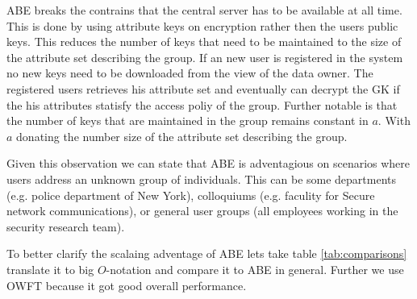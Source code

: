 ABE breaks the contrains that the central server has to be available at all time. This is done by using attribute keys on encryption rather then the users public keys. This reduces the number of keys that need to be maintained to the size of the attribute set describing the group. If an new user is registered in the system no new keys need to be downloaded from the view of the data owner. The registered users retrieves his attribute set and eventually can decrypt the GK if the his attributes statisfy the access poliy of the group. Further notable is that the number of keys that are maintained in the group remains constant in $a$. With $a$ donating the number size of the attribute set describing the group. 

Given this observation we can state that ABE is adventagious on scenarios where users address an unknown group of individuals. This can be some departments (e.g. police department of New York), colloquiums (e.g. faculity for Secure network communications), or general user groups (all employees working in the security research team).

To better clarify the scalaing adventage of ABE lets take table \ref{tab:comparisons} translate it to big $O$-notation and compare it to ABE in general. Further we use OWFT because it got good overall performance.

